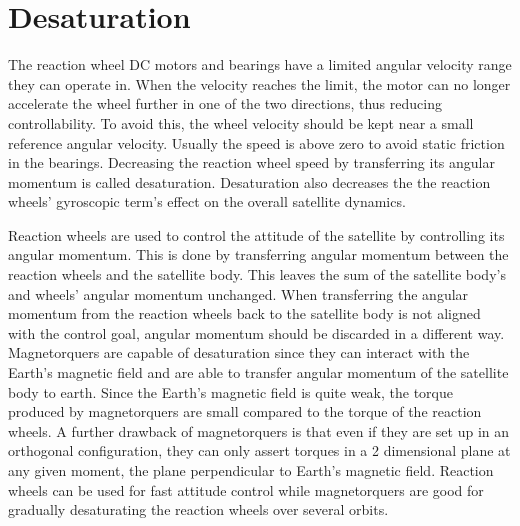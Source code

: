 \section{Desaturation}

The reaction wheel DC motors and bearings have a limited angular velocity range they can operate in. When the velocity reaches the limit, the motor can no longer accelerate the wheel further in one of the two directions, thus reducing controllability. To avoid this, the wheel velocity should be kept near a small reference angular velocity. Usually the speed is above zero to avoid static friction in the bearings. Decreasing the reaction wheel speed by transferring its angular momentum is called desaturation. Desaturation also decreases the the reaction wheels' gyroscopic term's effect on the overall satellite dynamics.

Reaction wheels are used to control the attitude of the satellite by controlling its angular momentum. This is done by transferring angular momentum between the reaction wheels and the satellite body. This leaves the sum of the satellite body's and wheels' angular momentum unchanged. When transferring the angular momentum from the reaction wheels back to the satellite body is not aligned with the control goal, angular momentum should be discarded in a different way. Magnetorquers are capable of desaturation since they can interact with the Earth's magnetic field and are able to transfer angular momentum of the satellite body to earth. Since the Earth's magnetic field is quite weak, the torque produced by magnetorquers are small compared to the torque of the reaction wheels. A further drawback of magnetorquers is that even if they are set up in an orthogonal configuration, they can only assert torques in a 2 dimensional plane at any given moment, the plane perpendicular to Earth's magnetic field. Reaction wheels can be used for fast attitude control while magnetorquers are good for gradually desaturating the reaction wheels over several orbits.

